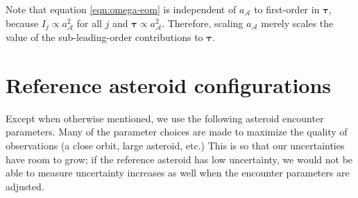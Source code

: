 Note that equation \ref{eqn:omega-eom} is independent of $a_\mathcal{A}$ to first-order in $\bm \tau$, because $I_{j} \propto a_\mathcal{A}^2$ for all $j$ and $\bm \tau \propto a_\mathcal{A}^2$. Therefore, scaling $a_\mathcal{A}$ merely scales the value of the sub-leading-order contributions to $\bm \tau$.




\section{Reference asteroid configurations}
\label{app:reference-configs}

Except when otherwise mentioned, we use the following asteroid encounter parameters. Many of the parameter choices are made to maximize the quality of observations (a close orbit, large asteroid, etc.) This is so that our uncertainties have room to grow; if the reference asteroid has low uncertainty, we would not be able to measure uncertainty increases as well when the encounter parameters are adjusted.

